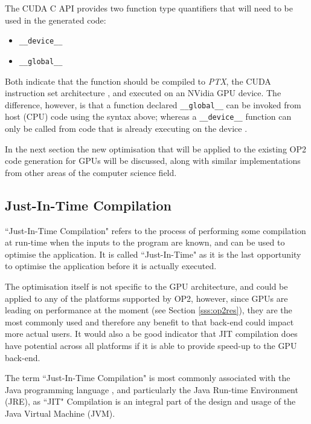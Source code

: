 
\noindent The CUDA C API provides two function type quantifiers that will need to be used in the generated code:
\begin{itemize}
\vspace{-.5cm}
\setlength{\itemsep}{0pt}%
\setlength{\parskip}{0pt}%
\item{\verb|__device__|}
\item{\verb|__global__|}
\vspace{-.5cm}
\end{itemize}
Both indicate that the function should be compiled to \textit{PTX}, the CUDA instruction set architecture \cite[p15]{guide}, and executed on an NVidia GPU device. The difference, however, is that a function declared \verb|__global__| can be invoked from host (CPU) code using the syntax above; whereas a \verb|__device__| function can only be called from code that is already executing on the device \cite[p81]{guide}.
\par
In the next section the new optimisation that will be applied to the existing OP2 code generation for GPUs will be discussed, along with similar implementations from other areas of the computer science field.
\clearpage
\subsection{Just-In-Time Compilation}
\label{ss:rw_JIT}

``Just-In-Time Compilation" refers to the process of performing some compilation at run-time when the inputs to the program are known, and can be used to optimise the application. It is called ``Just-In-Time" as it is the last opportunity to optimise the application before it is actually executed.
\par
The optimisation itself is not specific to the GPU architecture, and could be applied to any of the platforms supported by OP2, however, since GPUs are leading on performance at the moment (see Section \ref{sss:op2res}), they are the most commonly used and therefore any benefit to that back-end could impact more actual users. It would also a be good indicator that JIT compilation does have potential across all platforms if it is able to provide speed-up to the GPU back-end.
\par
The term ``Just-In-Time Compilation" is most commonly associated with the Java programming language \cite{java}, and particularly the Java Run-time Environment (JRE), as ``JIT" Compilation is an integral part of the design and usage of the Java Virtual Machine (JVM).
